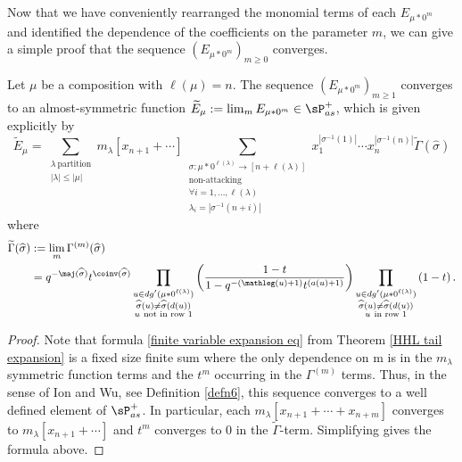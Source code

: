 Now that we have conveniently rearranged the monomial terms of each $E_{\mu*0^m}$ and identified the dependence of the coefficients on the parameter $m$, we can give a simple proof that the sequence $(E_{\mu*0^m})_{m \geq 0}$ converges.

\begin{coro}\label{convergence of macdonald}


Let $\mu$ be a composition with $\ell(\mu) = n$. The sequence $(E_{\mu * 0^m})_{m \geq 1}$ converges to an almost-symmetric function $\widetilde{E}_{\mu}:= \lim_{m} E_{\mu * 0^m} \in \sP_{as}^{+}$, which is given explicitly by 
\begin{equation}
       \widetilde{E}_{\mu} = 
        \sum_{\substack{\lambda ~ \text{partition}  \\ |\lambda| \leq |\mu|}} m_{\lambda}[x_{n+1}+ \cdots] \sum_{\substack{\sigma:\mu * 0^{\ell(\lambda)} \rightarrow [n+\ell(\lambda)]\\ \text{non-attacking} \\ \forall i = 1,\ldots,\ell(\lambda) \\ \lambda_i = |\sigma^{-1}(n+i)|}} x_1 ^{|\sigma^{-1}(1)|}\cdots x_n ^{|\sigma^{-1}(n)|} \widetilde{\Gamma}(\widehat{\sigma})
\end{equation}
%
where 
%
\begin{align*}
\widetilde{\Gamma}(\widehat{\sigma}) & := \lim_{m} \Gamma^{(m)}(\widehat{\sigma}) \\
&= q^{-\maj(\widehat{\sigma})}t^{\coinv(\widehat{\sigma})} \prod_{\substack{ u \in dg'(\mu * 0^{\ell(\lambda)}) \\ \widehat{\sigma}(u) \neq \widehat{\sigma}(d(u)) \\ u ~ \text{not in row } 1 }} \left( \frac{1-t}{1-q^{-(\mathleg(u)+1)}t^{(a(u)+1)}} \right) \prod_{\substack{ u \in dg'(\mu * 0^{\ell(\lambda)}) \\ \widehat{\sigma}(u) \neq \widehat{\sigma}(d(u)) \\ u ~ \text{in row } 1 }} \left( 1-t \right).
\end{align*}
\end{coro}


\begin{proof}
Note that formula \eqref{finite variable expansion eq} from Theorem \ref{HHL tail expansion} is a fixed size finite sum where the only dependence on m is in the $m_{\lambda}$ symmetric function terms and the $t^m$ occurring in the $\Gamma^{(m)}$ terms. Thus, in the sense of Ion and Wu, see Definition \ref{defn6}, this sequence converges to a well defined element of $\sP_{as}^{+}$. In particular, each $m_{\lambda}[x_{n+1}+\cdots +x_{n+m}]$ converges to $m_{\lambda}[x_{n+1}+ \cdots]$ and $t^m$ converges to 0 in the $\widetilde{\Gamma}$-term. Simplifying gives the formula above. 
\end{proof}

